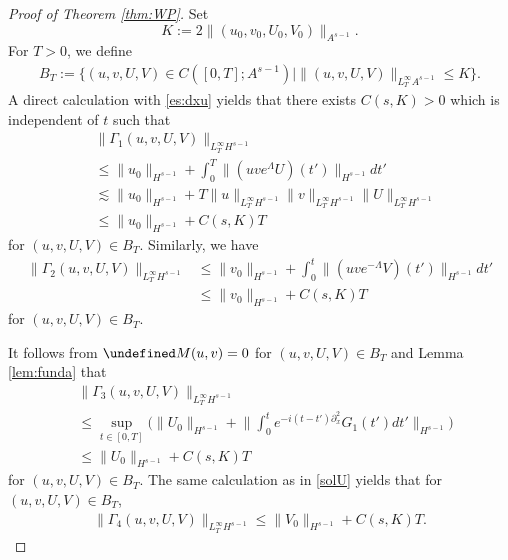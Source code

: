 \documentclass[%
11pt,  reqno]{amsart}
\newcommand{\G}{\Gamma}
\newcommand{\Ld}{\Lambda}
\newcommand{\dx}{\partial_x}
\newcommand{\les}{\lesssim}
\numberwithin{equation}{section}
\numberwithin{theorem}{section}
\let\Im=\undefined\DeclareMathOperator*{\Im}{Im}
\begin{document}
\begin{proof}[Proof of Theorem \ref{thm:WP}]
Set
\[
K:= 2\|(u_0, v_0, U_0, V_0)\|_{A^{s-1}}.
\]
For $T > 0$, we define 
\[
\begin{aligned}
B_T 
:= 
\{ 
(u, v, U, V) \in C([0,T]; A^{s-1}) \mid 
\|(u,v,U,V)\|_{L_T^\infty A^{s-1}} \le K
\}.
\end{aligned}
\]
A direct calculation with \eqref{es:dxu} yields that there exists $C(s,K) > 0$ which is independent of $t$ such that 
\begin{equation}
\begin{aligned}
&\| \G_1 (u,v,U,V) \|_{L_T^\infty H^{s-1}}
\\
&\le
\|u_0\|_{H^{s-1}} + \int_0^T \| (u v e^{\Ld} U) (t') \|_{H^{s-1}} dt'
\\
&\les
\|u_0\|_{H^{s-1}} + T \|u\|_{L_T^\infty H^{s-1}} \|v\|_{L_T^\infty H^{s-1}} 
\|U\|_{L_T^\infty H^{s-1}}
\\
&\le
\|u_0\|_{H^{s-1}} 
+ C(s, K) T
\end{aligned}
\label{solu}
\end{equation}
for $(u,v,U,V) \in B_T$.
Similarly, we have
\begin{equation}
\begin{aligned}
\| \G_2 (u,v,U,V) \|_{L_T^\infty H^{s-1}}
&\le
\|v_0\|_{H^{s-1}} + \int_0^t \| (u v e^{- \Ld} V) (t') \|_{H^{s-1}} dt'
\\
&\le
\|v_0\|_{H^{s-1}} + C(s, K) T
\end{aligned}
\label{solv}
\end{equation}
for $(u,v,U,V) \in B_T$.

It follows from $\Im M(u,v) = 0$ for $(u,v,U,V) \in B_T$ and Lemma \ref{lem:funda} that
\begin{equation}
\begin{aligned}
&\|\G_3(u,v,U,V)\|_{L_T^\infty H^{s-1}}
\\
&\le
\sup_{t \in [0,T]} \Big( \|U_0\|_{H^{s-1}}+
\Big \| \int_0^t e^{- i (t - t') \dx^2 } G_1(t') dt' \Big\|_{H^{s-1}} \Big)
\\
&\le
\|U_0\|_{H^{s-1}}
+
C(s, K) T
\end{aligned}
\label{solU}
\end{equation}
for $(u,v,U,V) \in B_T$.
The same calculation as in \eqref{solU} yields that for $(u,v,U,V) \in B_T$,
\begin{equation}
\begin{aligned}
\| \G_4 (u,v,U,V) \|_{L_T^\infty H^{s-1}}
\le \|V_0\|_{H^{s-1}} 
+ C(s, K) T.
\end{aligned}
\label{solV}
\end{equation}


\end{proof}
\end{document}

